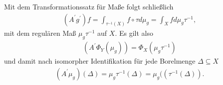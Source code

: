 \begin{solution}
Mit dem Transformationssatz für Maße folgt schließlich
\begin{align*}
  (A^{\prime}g^{\prime})f = \int_{\tau^{-1}(X)} f \circ \tau d\mu_g
  = \int_{X} f d\mu_g\tau^{-1},
\end{align*}
mit dem regulären Maß $\mu_g\tau^{-1}$ auf $X$.
Es gilt also
\begin{align*}
  (A^{\prime}\Phi_Y(\mu_g)) = \Phi_X(\mu_g\tau^{-1})
\end{align*}
und damit nach isomorpher Identifikation für jede Borelmenge $\Delta \subseteq X$
\begin{align*}
  (A^{\prime}\mu_g)(\Delta) = \mu_g\tau^{-1}(\Delta) = \mu_g((\tau^{-1}(\Delta)).
\end{align*}
\end{solution}
